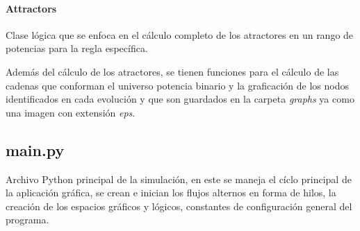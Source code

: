\documentclass[]{article}
\begin{document}
			\paragraph{Attractors}
				Clase lógica que se enfoca en el cálculo completo de los atractores en un rango de potencias para la regla específica.
				
				Además del cálculo de los atractores, se tienen funciones para el cálculo de las cadenas que conforman el universo potencia binario y la graficación de los nodos identificados en cada evolución y que son guardados en la carpeta \textit{graphs} ya como una imagen con extensión \textit{eps}.
			
			
			
		\subsection{main.py}
			Archivo Python principal de la simulación, en este se maneja el cíclo principal de la aplicación gráfica, se crean e inician los flujos alternos en forma de hilos, la creación de los espacios gráficos y lógicos, constantes de configuración general del programa.
			
			
\end{document}
